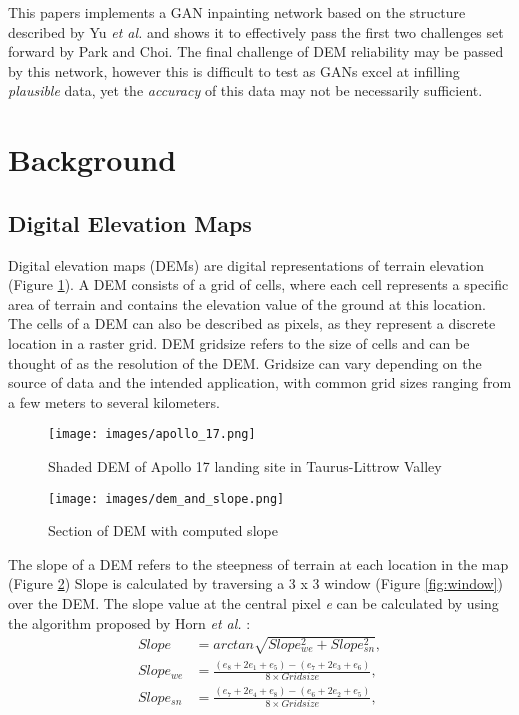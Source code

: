 \documentclass[twocolumn]{article}
\begin{document}
This papers implements a GAN inpainting network based on the structure described by Yu \emph{et al.}\autocite{yuGenerativeImageInpainting2018} and shows it to effectively pass the first two challenges set forward by Park and Choi\autocite{parkNeuralProcessApproach2021}.
The final challenge of DEM reliability may be passed by this network, however this is difficult to test as GANs excel at infilling \emph{plausible} data, yet the \emph{accuracy} of this data may not be necessarily sufficient.


\section{Background}
\label{sec:orgfd61a48}
\subsection{Digital Elevation Maps}
\label{sec:org0242f85}

Digital elevation maps (DEMs) are digital representations of terrain elevation (Figure \ref{fig:apollo_17}).
A DEM consists of a grid of cells, where each cell represents a specific area of terrain and contains the elevation value of the ground at this location.
The cells of a DEM can also be described as pixels, as they represent a discrete location in a raster grid.
DEM gridsize refers to the size of cells and can be thought of as the resolution of the DEM.
Gridsize can vary depending on the source of data and the intended application, with common grid sizes ranging from a few meters to several kilometers.

\begin{figure}[htbp]
\centering
\texttt{[image: images/apollo\_17.png]}
\caption{\label{fig:apollo_17}Shaded DEM of Apollo 17 landing site in Taurus-Littrow Valley}
\end{figure}

\begin{figure}[htbp]
\centering
\texttt{[image: images/dem\_and\_slope.png]}
\caption{\label{fig:dem_and_slope}Section of DEM with computed slope}
\end{figure}

The slope of a DEM refers to the steepness of terrain at each location in the map (Figure \ref{fig:dem_and_slope})
Slope is calculated by traversing a 3 x 3 window (Figure \ref{fig:window}) over the DEM\autocite{qiuVoidFillingDigital2019}.
The slope value at the central pixel \emph{e} can be calculated by using the algorithm proposed by Horn \emph{et al.}\autocite{hornHillShadingReflectance1981} :
\begin{align}
Slope &= arctan\sqrt{Slope^2_{we} + Slope^2_{sn}}, \\
Slope_{we} &= \frac{(e_8 + 2e_1 + e_5) - (e_7 + 2e_3 + e_6)}{8 \times Gridsize}, \\
Slope_{sn} &= \frac{(e_7 + 2e_4 + e_8) - (e_6 + 2e_2 + e_5)}{8 \times Gridsize},
\end{align}
\end{document}
